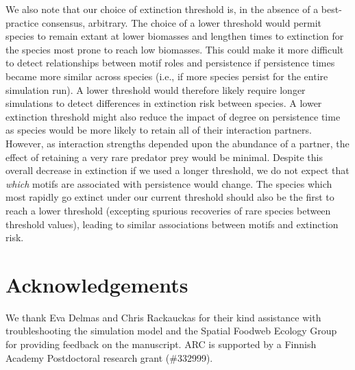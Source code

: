 \documentclass[12pt]{article}
\begin{document}
\begin{spacing}{2.0}
        
        We also note that our choice of extinction threshold is, in the absence of a best-practice consensus, arbitrary.
        The choice of a lower threshold would permit species to remain extant at lower biomasses and lengthen times to extinction for the species most prone to reach low biomasses.
        This could make it more difficult to detect relationships between motif roles and persistence if persistence times became more similar across species (i.e., if more species persist for the entire simulation run). 
        A lower threshold would therefore likely require longer simulations to detect differences in extinction risk between species.
        A lower extinction threshold might also reduce the impact of degree on persistence time as species would be more likely to retain all of their interaction partners.
        However, as interaction strengths depended upon the abundance of a partner, the effect of retaining a very rare predator prey would be minimal.
        Despite this overall decrease in extinction if we used a longer threshold,  we do not expect that \emph{which} motifs are associated with persistence would change.
        The species which most rapidly go extinct under our current threshold should also be the first to reach a lower threshold (excepting spurious recoveries of rare species between threshold values), leading to similar associations between motifs and extinction risk.


\section*{Acknowledgements}

	We thank Eva Delmas and Chris Rackauckas for their kind assistance with troubleshooting the simulation model and the Spatial Foodweb Ecology Group for providing feedback on the manuscript. ARC is supported by a Finnish Academy Postdoctoral research grant (\#332999). 


\clearpage
     

\clearpage
\end{spacing}

\clearpage

\end{document}

